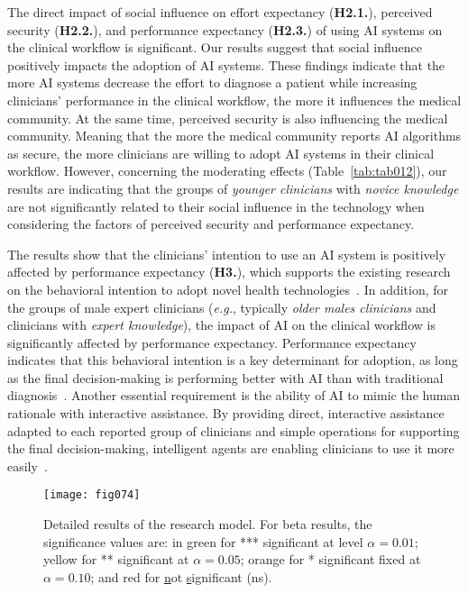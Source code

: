 The direct impact of social influence on effort expectancy ({\bf H2.1.}), perceived security ({\bf H2.2.}), and performance expectancy ({\bf H2.3.}) of using AI systems on the clinical workflow is significant.
Our results suggest that social influence positively impacts the adoption of AI systems.
These findings indicate that the more AI systems decrease the effort to diagnose a patient while increasing clinicians' performance in the clinical workflow, the more it influences the medical community.
At the same time, perceived security is also influencing the medical community.
Meaning that the more the medical community reports AI algorithms as secure, the more clinicians are willing to adopt AI systems in their clinical workflow.
However, concerning the moderating effects (Table~\ref{tab:tab012}), our results are indicating that the groups of {\it younger clinicians} with {\it novice knowledge} are not significantly related to their social influence in the technology when considering the factors of perceived security and performance expectancy.

The results show that the clinicians' intention to use an AI system is positively affected by performance expectancy ({\bf H3.}), which supports the existing research on the behavioral intention to adopt novel health technologies~\cite{DWIVEDI2016174, Seethamraju2018, WU2021106840}.
In addition, for the groups of male expert clinicians ({\it e.g.}, typically {\it older males clinicians} and clinicians with {\it expert knowledge}), the impact of AI on the clinical workflow is significantly affected by performance expectancy.
Performance expectancy indicates that this behavioral intention is a key determinant for adoption, as long as the final decision-making is performing better with AI than with traditional diagnosis~\cite{LIN2021e486}.
Another essential requirement is the ability of AI to mimic the human rationale with interactive assistance.
By providing direct, interactive assistance adapted to each reported group of clinicians and simple operations for supporting the final decision-making, intelligent agents are enabling clinicians to use it more easily~\cite{CALISTO2021102607}.

\begin{figure*}
\centering
\texttt{[image: fig074]}
\caption{Detailed results of the research model. For beta results, the significance values are: in green for *** significant at level $\alpha = 0.01$; yellow for ** significant at $\alpha = 0.05$; orange for * significant fixed at $\alpha = 0.10$; and red for \underline{n}ot \underline{s}ignificant (ns).}
\label{fig:fig074}
\end{figure*}

